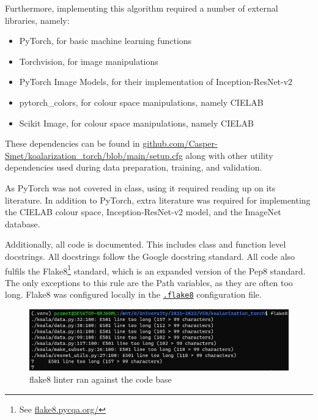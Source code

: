 \documentclass{article}
\begin{document}
        Furthermore, implementing this algorithm required a number of external libraries, namely:
        
        \begin{itemize}
            \item PyTorch, for basic machine learning functions
            \item Torchvision, for image manipulations
            \item PyTorch Image Models, for their implementation of Inception-ResNet-v2
            \item pytorch\_colors, for colour space manipulations, namely CIELAB
            \item Scikit Image, for colour space manipulations, namely CIELAB
        \end{itemize}
        
        These dependencies can be found in \href{https://github.com/Casper-Smet/koalarization\_torch/blob/main/setup.cfg}{github.com/Casper-Smet/koalarization\_torch/blob/main/setup.cfg} along with other utility dependencies used during data preparation, training, and validation.
        
        As PyTorch was not covered in class, using it required reading up on its literature. In addition to PyTorch, extra literature was required for implementing the CIELAB colour space, Inception-ResNet-v2 model, and the ImageNet database.
        
        Additionally, all code is documented. This includes class and function level docstrings. All docstrings follow the Google docstring standard. All code also fulfils the Flake8\footnote{See \href{https://flake8.pycqa.org/}{flake8.pycqa.org/}} standard, which is an expanded version of the Pep8 standard. The only exceptions to this rule are the Path variables, as they are often too long. Flake8 was configured locally in the \href{https://github.com/Casper-Smet/koalarization\_torch/blob/main/.flake8}{\texttt{.flake8}} configuration file.
        
        \begin{figure}[H]
            \centering
            \includegraphics[width=\textwidth]{img/flake8-results.jpg}
            \caption{flake8 linter ran against the code base}
            \label{fig:flake8}
        \end{figure}
        
\end{document}

